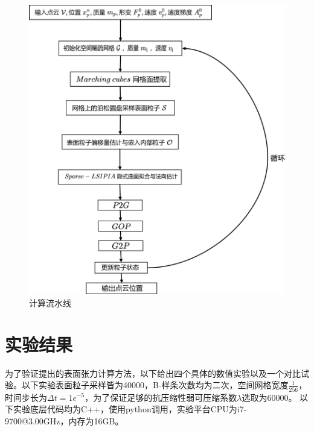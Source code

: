 \begin{figure}[htbp]
    \centering
    \includegraphics[scale=0.9]{./images/image17.png}
    \caption[计算流水线]{计算流水线}
    \label{fig: pipline}
\end{figure}

\section{实验结果}
为了验证提出的表面张力计算方法，以下给出四个具体的数值实验以及一个对比试验。以下实验表面粒子采样皆为40000，B-样条次数均为二次，空间网格宽度$\frac{1}{256}$，时间步长为$\Delta t = 1e^{-5}$，为了保证足够的抗压缩性弱可压缩系数$\lambda$选取为$60000$。
以下实验底层代码均为C++，使用python调用，实验平台CPU为i7-9700@3.00GHz，内存为16GB。

